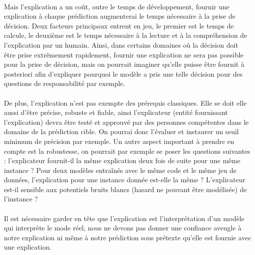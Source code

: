 \paragraph{}Mais l'explication a un coût, outre le temps de développement, fournir une explication à chaque prédiction augmenterai le temps nécessaire à la prise de décision. Deux facteurs principaux entrent en jeu, le premier est le temps de calcule, le deuxième est le temps nécessaire à la lecture et à la compréhension de l'explication par un humain. Ainsi, dans certains domaines où la décision doit être prise extrêmement rapidement, fournir une explication ne sera pas possible pour la prise de décision, mais on pourrait imaginer qu'elle puisse être fournit à posteriori afin d'expliquer pourquoi le modèle a pris une telle décision pour des questions de responsabilité par exemple.

\paragraph{}De plus, l'explication n'est pas exempte des prérequis classiques. Elle se doit elle aussi d'être précise, robuste et fiable, ainsi l'explicateur (entité fournissant l'explication) devra être testé et approuvé par des personnes compétentes dans le domaine de la prédiction cible. On pourrai donc l'évaluer et instaurer un seuil minimum de précision par exemple. Un autre aspect important à prendre en compte est la robustesse, on pourrait par exemple se poser les questions suivantes : l'explicateur fournit-il la même explication deux fois de suite pour une même instance ? Pour deux modèles entraînés avec le même code et le même jeu de données, l'explication pour une instance donnée est-elle la même ? L'explicateur est-il sensible aux potentiels bruits blancs (hasard ne pouvant être modélisée) de l'instance ?

\paragraph{}Il est nécessaire garder en tête  que l'explication est l'interprétation d'un modèle qui interprète le mode réel, nous ne devons pas donner une confiance aveugle à notre explication ni même à notre prédiction sous prétexte qu'elle est fournie avec une explication.
